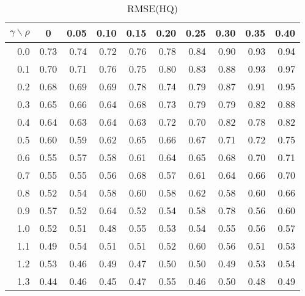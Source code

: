 \documentclass[12pt]{article}
\begin{document}
%
\begin{table}[!tbp]
\caption{RMSE(HQ)}
 \begin{center}
 \begin{tabular}{r|rrrrrrrrr}\hline\hline
\multicolumn{1}{c|}{$\gamma\backslash\rho$}&\multicolumn{1}{c}{0}&\multicolumn{1}{c}{0.05}&\multicolumn{1}{c}{0.10}&\multicolumn{1}{c}{0.15}&\multicolumn{1}{c}{0.20}&\multicolumn{1}{c}{0.25}&\multicolumn{1}{c}{0.30}&\multicolumn{1}{c}{0.35}&\multicolumn{1}{c}{0.40}\tabularnewline
\hline

0.0&0.73&0.74&0.72&0.76&0.78&0.84&0.90&0.93&0.94\tabularnewline
0.1&0.70&0.71&0.76&0.75&0.80&0.83&0.88&0.93&0.97\tabularnewline
0.2&0.68&0.69&0.69&0.78&0.74&0.79&0.87&0.91&0.95\tabularnewline
0.3&0.65&0.66&0.64&0.68&0.73&0.79&0.79&0.82&0.88\tabularnewline
0.4&0.64&0.63&0.64&0.63&0.72&0.70&0.82&0.78&0.82\tabularnewline
0.5&0.60&0.59&0.62&0.65&0.66&0.67&0.71&0.72&0.75\tabularnewline
0.6&0.55&0.57&0.58&0.61&0.64&0.65&0.68&0.70&0.71\tabularnewline
0.7&0.55&0.55&0.56&0.68&0.57&0.61&0.64&0.66&0.70\tabularnewline
0.8&0.52&0.54&0.58&0.60&0.58&0.62&0.58&0.60&0.66\tabularnewline
0.9&0.57&0.52&0.64&0.52&0.54&0.58&0.78&0.56&0.60\tabularnewline
1.0&0.52&0.51&0.48&0.55&0.53&0.54&0.55&0.56&0.57\tabularnewline
1.1&0.49&0.54&0.51&0.51&0.52&0.60&0.56&0.51&0.53\tabularnewline
1.2&0.53&0.46&0.49&0.47&0.50&0.50&0.49&0.53&0.54\tabularnewline
1.3&0.44&0.46&0.45&0.47&0.55&0.46&0.50&0.48&0.49\tabularnewline
\hline
\end{tabular}

\end{center}

\end{table}
\end{document}
